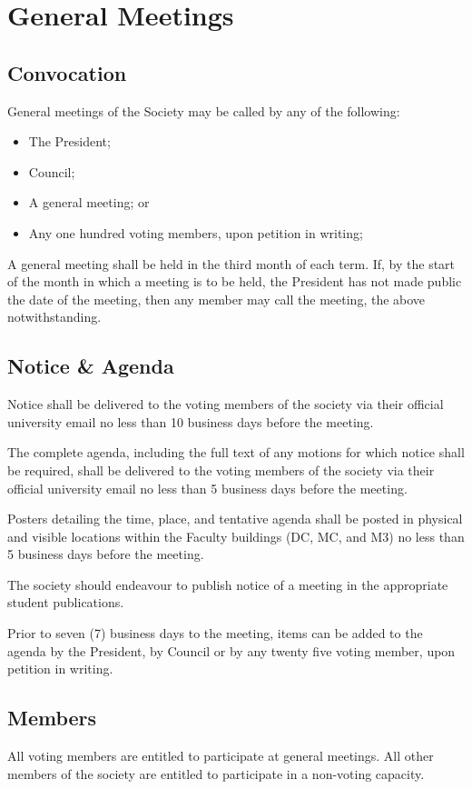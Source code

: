 \section{General Meetings}
\subsection{Convocation}
General meetings of the Society may be called by any of the following:
\begin{itemize}
  \item The President;
  \item Council;
  \item A general meeting; or
  \item Any one hundred voting members, upon petition in writing;
\end{itemize}

A general meeting shall be held in the third month of each term. If, by the
start of the month in which a meeting is to be held, the President has not
made public the date of the meeting, then any member may call the meeting, the
above notwithstanding.

\subsection{Notice \& Agenda}

Notice shall be delivered to the voting members of the society via their official university email no less than 10 business days before the meeting.

The complete agenda, including the full text of any motions for which notice shall be required, shall be delivered to the voting members of the society via their official university email no less than 5 business days before the meeting.

Posters detailing the time, place, and tentative agenda shall be posted in physical and visible locations within the Faculty buildings (DC, MC, and M3) no less than 5 business days before the meeting.

The society should endeavour to publish notice of a meeting in the appropriate student publications.

Prior to seven (7) business days to the meeting, items can be added to the agenda by the President, by Council or by any twenty five voting member, upon petition in writing.

\subsection{Members}
All voting members are entitled to participate at general meetings. All other
members of the society are entitled to participate in a non-voting capacity.

